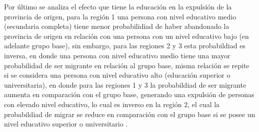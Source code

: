 \documentclass[12pt,a4paper]{article}
\begin{document}
Por último se analiza el efecto que tiene la educación en la expulsión de la provincia de origen, para la región 1  una persona con nivel educativo medio (secundaria completa) tiene menor probabilidiad de haber abandonado la provincia de origen en relación con una persona con un nivel educativo bajo (en adelante grupo base), sin embargo, para las regiones 2 y 3 esta probabildiad es inversa, en donde una persona con nivel educativo medio tiene una mayor probabilidad de ser migrante en relación al grupo base, misma relación se repite si se considera una persona con nivel educativo alto (educación superior o universitaria), en donde para las regiones 1 y 3 la probabildiad de ser migrante aumenta en comparación con el grupo base, generando una expulsión de personas con elevado nivel educativo, lo cual es inverso en la región 2, el cual la probabildiad de migrar se reduce en comparación con el grupo base si se posee un nivel educativo superior o universitario .
\end{document}
